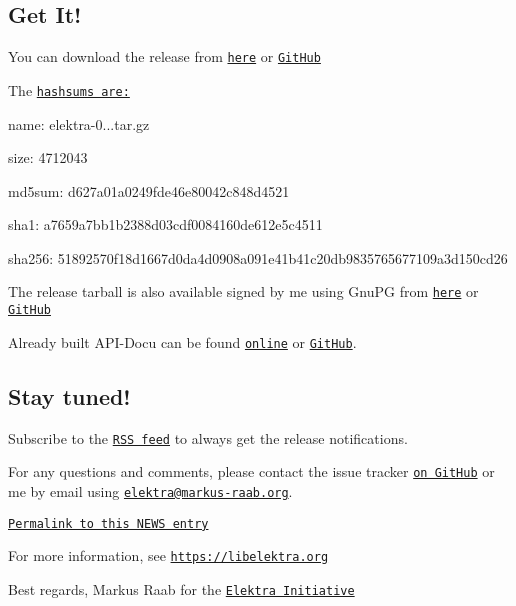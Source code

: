 \subsection*{Get It!}

You can download the release from \href{https://www.libelektra.org/ftp/elektra/releases/elektra-0.8.21.tar.gz}{\tt here} or \href{https://github.com/ElektraInitiative/ftp/blob/master/releases/elektra-0.8.21.tar.gz?raw=true}{\tt Git\+Hub}

The \href{https://github.com/ElektraInitiative/ftp/blob/master/releases/elektra-0.8.21.tar.gz.hashsum?raw=true}{\tt hashsums are\+:}


\begin{DoxyItemize}
\item name\+: elektra-\/0...\+tar.\+gz
\item size\+: 4712043
\item md5sum\+: d627a01a0249fde46e80042c848d4521
\item sha1\+: a7659a7bb1b2388d03cdf0084160de612e5c4511
\item sha256\+: 51892570f18d1667d0da4d0908a091e41b41c20db9835765677109a3d150cd26
\end{DoxyItemize}

The release tarball is also available signed by me using Gnu\+PG from \href{https://www.libelektra.org/ftp/elektra/releases/elektra-0.8.21.tar.gz.gpg}{\tt here} or \href{https://github.com/ElektraInitiative/ftp/blob/master/releases//elektra-0.8.21.tar.gz.gpg?raw=true}{\tt Git\+Hub}

Already built A\+P\+I-\/\+Docu can be found \href{https://doc.libelektra.org/api/0.8.21/html/}{\tt online} or \href{https://github.com/ElektraInitiative/doc/tree/master/api/0.8.21}{\tt Git\+Hub}.

\subsection*{Stay tuned!}

Subscribe to the \href{https://www.libelektra.org/news/feed.rss}{\tt R\+SS feed} to always get the release notifications.

For any questions and comments, please contact the issue tracker \href{http://issues.libelektra.org}{\tt on Git\+Hub} or me by email using \href{mailto:elektra@markus-raab.org}{\tt elektra@markus-\/raab.\+org}.

\href{https://www.libelektra.org/news/0.8.21-release}{\tt Permalink to this N\+E\+WS entry}

For more information, see \href{https://libelektra.org}{\tt https\+://libelektra.\+org}

Best regards, Markus Raab for the \href{https://www.libelektra.org/developers/authors}{\tt Elektra Initiative} 